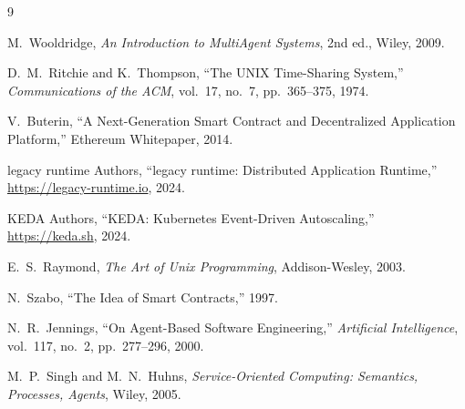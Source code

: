 \documentclass[11pt,a4paper]{article}
\begin{document}
\begin{thebibliography}{9}

M.~Wooldridge, \emph{An Introduction to MultiAgent Systems}, 2nd ed.,
Wiley, 2009.

D.~M.~Ritchie and K.~Thompson, ``The UNIX Time-Sharing System,''
\emph{Communications of the ACM}, vol.~17, no.~7, pp.~365--375, 1974.

V.~Buterin, ``A Next-Generation Smart Contract and Decentralized
Application Platform,'' Ethereum Whitepaper, 2014.

legacy runtime Authors, ``legacy runtime: Distributed Application Runtime,''
\url{https://legacy-runtime.io}, 2024.

KEDA Authors, ``KEDA: Kubernetes Event-Driven Autoscaling,''
\url{https://keda.sh}, 2024.

E.~S.~Raymond, \emph{The Art of Unix Programming}, Addison-Wesley, 2003.

N.~Szabo, ``The Idea of Smart Contracts,'' 1997.

N.~R.~Jennings, ``On Agent-Based Software Engineering,''
\emph{Artificial Intelligence}, vol.~117, no.~2, pp.~277--296, 2000.

M.~P.~Singh and M.~N.~Huhns, \emph{Service-Oriented Computing:
Semantics, Processes, Agents}, Wiley, 2005.

\end{thebibliography}
\end{document}
